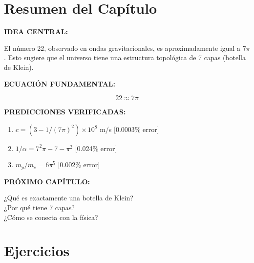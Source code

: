 \section{Resumen del Capítulo}

\begin{tcolorbox}[colback=kleingray, colframe=kleinblue, title=\textbf{Resumen del Capítulo 1}]

\textbf{IDEA CENTRAL:}

El número 22, observado en ondas gravitacionales, es aproximadamente
igual a $7\pi$. Esto sugiere que el universo tiene una estructura
topológica de 7 capas (botella de Klein).

\vspace{0.3cm}
\textbf{ECUACIÓN FUNDAMENTAL:}

\begin{equation}
\boxed{22 \approx 7\pi}
\end{equation}

\vspace{0.3cm}
\textbf{PREDICCIONES VERIFICADAS:}

\begin{enumerate}
    \item $c = (3 - 1/(7\pi)^2) \times 10^8$ m/s \hfill [0.0003\% error]
    \item $1/\alpha = 7^2\pi - 7 - \pi^2$ \hfill [0.024\% error]
    \item $m_p/m_e = 6\pi^5$ \hfill [0.002\% error]
\end{enumerate}

\vspace{0.3cm}
\textbf{PRÓXIMO CAPÍTULO:}

¿Qué es exactamente una botella de Klein?\\
¿Por qué tiene 7 capas?\\
¿Cómo se conecta con la física?

\end{tcolorbox}


\section*{Ejercicios}

